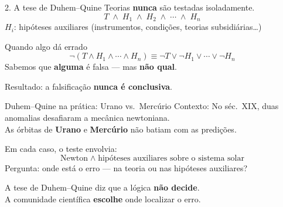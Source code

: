 \documentclass[aspectratio=169]{beamer}
\newcommand{\impt}[1]{\textcolor{maccent}{\textbf{#1}}}
\newcommand{\ntc}[1]{\textcolor{mprimary}{#1}}
\begin{document}
\begin{frame}{2. A tese de Duhem--Quine}
Teorias \impt{nunca} são testadas isoladamente.
\vspace{0.3cm}
\pause
\[
T \;\wedge\; H_1 \;\wedge\; H_2 \;\wedge\; \cdots \;\wedge\; H_n
\]
\vspace{0.1cm}
$H_i$: hipóteses auxiliares (instrumentos, condições, teorias subsidiárias\ldots)
\pause
\vspace{0.4cm}
\begin{alertblock}{Quando algo dá errado}
\[
\neg(T \wedge H_1 \wedge \cdots \wedge H_n) \equiv \neg T \vee \neg H_1 \vee \cdots \vee \neg H_n
\]
Sabemos que \impt{alguma} é falsa --- mas \impt{não qual}.
\end{alertblock}
\pause
\vspace{0.3cm}
\ntc{Resultado:} a falsificação \impt{nunca é conclusiva}.
\end{frame}

\begin{frame}{Duhem--Quine na prática: Urano vs.\ Mercúrio}
\ntc{Contexto:} No séc.~XIX, duas anomalias desafiaram a mecânica newtoniana. \\
As órbitas de \impt{Urano} e \impt{Mercúrio} não batiam com as predições.
\vspace{0.3cm}
\pause

Em cada caso, o teste envolvia:
\[
\text{Newton} \;\wedge\; \text{hipóteses auxiliares sobre o sistema solar}
\]
\pause
\vspace{0.2cm}
\ntc{Pergunta:} onde está o erro --- na teoria ou nas hipóteses auxiliares?
\pause
\vspace{0.3cm}
\begin{alertblock}{}
A tese de Duhem--Quine diz que a lógica \impt{não decide}. \\
A comunidade científica \impt{escolhe} onde localizar o erro.
\end{alertblock}
\end{frame}
\end{document}

